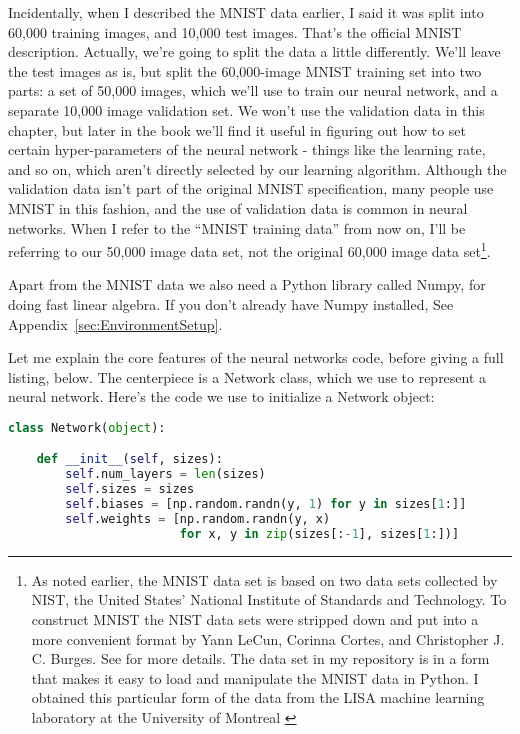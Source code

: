 Incidentally, when I described the MNIST data earlier, I said it was split into 60,000 training images, and 10,000 test images. That's the official MNIST description. Actually, we're going to split the data a little differently. We'll leave the test images as is, but split the 60,000-image MNIST training set into two parts: a set of 50,000 images, which we'll use to train our neural network, and a separate 10,000 image validation set. We won't use the validation data in this chapter, but later in the book we'll find it useful in figuring out how to set certain hyper-parameters of the neural network - things like the learning rate, and so on, which aren't directly selected by our learning algorithm. Although the validation data isn't part of the original MNIST specification, many people use MNIST in this fashion, and the use of validation data is common in neural networks. When I refer to the ``MNIST training data'' from now on, I'll be referring to our 50,000 image data set, not the original 60,000 image data set\footnote{As noted earlier, the MNIST data set is based on two data sets collected by NIST, the United States' National Institute of Standards and Technology. To construct MNIST the NIST data sets were stripped down and put into a more convenient format by Yann LeCun, Corinna Cortes, and Christopher J. C. Burges. See \cite{LeCun2019} for more details. The data set in my repository is in a form that makes it easy to load and manipulate the MNIST data in Python. I obtained this particular form of the data from the LISA machine learning laboratory at the University of Montreal \cite{LISALabGStart2019}}.

Apart from the MNIST data we also need a Python library called Numpy, for doing fast linear algebra. If you don't already have Numpy installed, See Appendix~\ref{sec:EnvironmentSetup}.

Let me explain the core features of the neural networks code, before giving a full listing, below. The centerpiece is a Network class, which we use to represent a neural network. Here's the code we use to initialize a Network object:

\begin{fullwidth}
\begin{lstlisting}[language=Python]
class Network(object):

    def __init__(self, sizes):
        self.num_layers = len(sizes)
        self.sizes = sizes
        self.biases = [np.random.randn(y, 1) for y in sizes[1:]]
        self.weights = [np.random.randn(y, x) 
                        for x, y in zip(sizes[:-1], sizes[1:])]
\end{lstlisting}
\end{fullwidth}
                        
